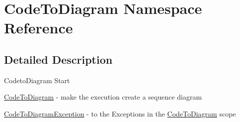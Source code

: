 \hypertarget{namespace_code_to_diagram}{
\section{CodeToDiagram Namespace Reference}
\label{namespace_code_to_diagram}
}


\subsection{Detailed Description}
CodetoDiagram Start

\hyperlink{class_code_to_diagram}{CodeToDiagram} - make the execution create a sequence diagram

\hyperlink{class_code_to_diagram_exception}{CodeToDiagramException} - to the Exceptions in the \hyperlink{class_code_to_diagram}{CodeToDiagram} scope 


